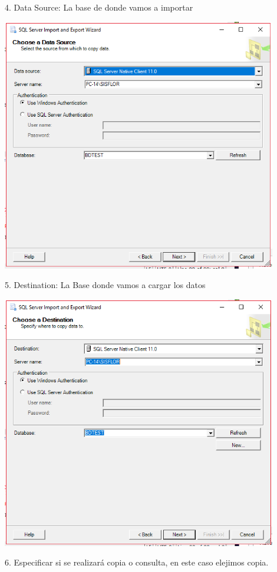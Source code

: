 4. Data Source: La base de donde vamos a importar 
	\begin{center}
	\includegraphics[width=12cm]{./Imagenes/img4}
	\end{center}	
5. Destination: La Base donde vamos a cargar los datos\\
	\begin{center}
	\includegraphics[width=12cm]{./Imagenes/img5}
	\end{center}	
6. Especificar si se realizará copia o consulta, en este caso elejimos copia.\\
